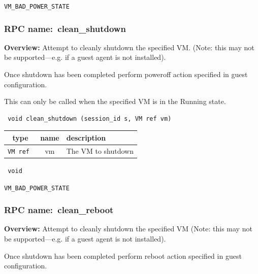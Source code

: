  {\tt VM\_BAD\_POWER\_STATE}

\vspace{0.6cm}
\subsubsection{RPC name:~clean\_shutdown}

{\bf Overview:} 
Attempt to cleanly shutdown the specified VM. (Note: this may not be
supported---e.g. if a guest agent is not installed).

Once shutdown has been completed perform poweroff action specified in guest
configuration.

This can only be called when the specified VM is in the Running state.

\begin{verbatim} void clean_shutdown (session_id s, VM ref vm)\end{verbatim}



 
\vspace{0.3cm}
\begin{tabular}{|c|c|p{7cm}|}
 \hline
{\bf type} & {\bf name} & {\bf description} \\ \hline
{\tt VM ref } & vm & The VM to shutdown \\ \hline 

\end{tabular}

\vspace{0.3cm}

{\tt 
void
}



\vspace{0.3cm}

 {\tt VM\_BAD\_POWER\_STATE}

\vspace{0.6cm}
\subsubsection{RPC name:~clean\_reboot}

{\bf Overview:} 
Attempt to cleanly shutdown the specified VM (Note: this may not be
supported---e.g. if a guest agent is not installed).

Once shutdown has been completed perform reboot action specified in guest
configuration.

